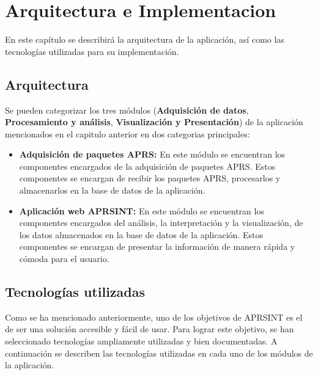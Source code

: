 \titlespacing*{\chapter}{0pt}{-1.25cm}{25pt}
\chapter{Arquitectura e Implementacion}

En este capítulo se describirá la arquitectura de la aplicación, así como las tecnologías utilizadas para su implementación. 

\section{Arquitectura}

Se pueden categorizar los tres módulos (\textbf{Adquisición de datos}, \textbf{Procesamiento y análisis}, \textbf{Visualización y Presentación}) de la aplicación mencionados en el capitulo anterior en dos categorias principales:

\begin{itemize}
	\item \textbf{Adquisición de paquetes APRS:} En este módulo se encuentran los componentes encargados de la adquisición de paquetes APRS. Estos componentes se encargan de recibir los paquetes APRS, procesarlos y almacenarlos en la base de datos de la aplicación.
	
	\item \textbf{Aplicación web APRSINT:} En este módulo se encuentran los componentes encargados del análisis, la interpretación y la visualización, de los datos almacenados en la base de datos de la aplicación. Estos componentes se encargan de presentar la información de manera rápida y cómoda para el usuario. 
\end{itemize}

\section{Tecnologías utilizadas}

Como se ha mencionado anteriormente, uno de los objetivos de APRSINT es el de ser una solución accesible y fácil de usar. Para lograr este objetivo, se han seleccionado tecnologías ampliamente utilizadas y bien documentadas. A continuación se describen las tecnologías utilizadas en cada uno de los módulos de la aplicación.

